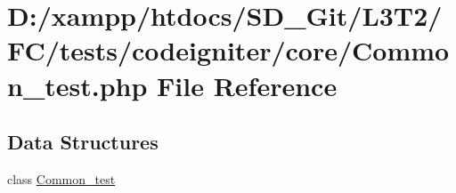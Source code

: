 \hypertarget{tests_2codeigniter_2core_2_common__test_8php}{}\section{D\+:/xampp/htdocs/\+S\+D\+\_\+\+Git/\+L3\+T2/\+F\+C/tests/codeigniter/core/\+Common\+\_\+test.php File Reference}
\label{tests_2codeigniter_2core_2_common__test_8php}
\subsection*{Data Structures}
\begin{DoxyCompactItemize}
\item 
class \hyperlink{class_common__test}{Common\+\_\+test}
\end{DoxyCompactItemize}
